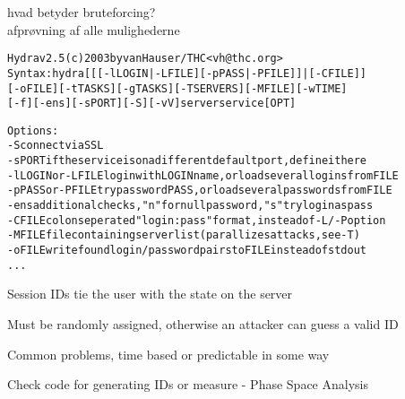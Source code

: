 \documentclass[Screen16to9,17pt]{foils}
\begin{document}

\begin{list1}
\item hvad betyder bruteforcing?\\
afprøvning af alle mulighederne
\end{list1}

\begin{alltt}\footnotesize
Hydra v2.5 (c) 2003 by van Hauser / THC <vh@thc.org>
Syntax: hydra [[[-l LOGIN|-L FILE] [-p PASS|-P FILE]] | [-C FILE]]
[-o FILE] [-t TASKS] [-g TASKS] [-T SERVERS] [-M FILE] [-w TIME]
[-f] [-e ns] [-s PORT] [-S] [-vV] server service [OPT]

Options:
  -S        connect via SSL
  -s PORT   if the service is on a different default port, define it here
  -l LOGIN  or -L FILE login with LOGIN name, or load several logins from FILE
  -p PASS   or -P FILE try password PASS, or load several passwords from FILE
  -e ns     additional checks, "n" for null password, "s" try login as pass
  -C FILE   colon seperated "login:pass" format, instead of -L/-P option
  -M FILE   file containing server list (parallizes attacks, see -T)
  -o FILE   write found login/password pairs to FILE instead of stdout
...
\end{alltt}





\begin{list2}
\item Session IDs tie the user with the state on the server
\item Must be randomly assigned, otherwise an attacker can guess a valid ID
\item Common problems, time based or predictable in some way
\item Check code for generating IDs or measure - Phase Space Analysis
\end{list2}




\slidenext{}
\end{document}
